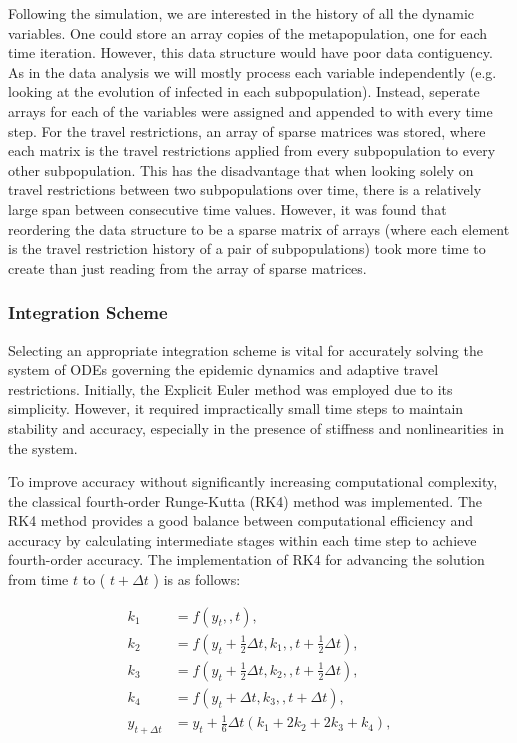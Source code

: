 
Following the simulation, we are interested in the history of all the dynamic variables. One could store an array copies of the metapopulation, one for each time iteration. However, this data structure would have poor data contiguency. As in the data analysis we will mostly process each variable independently (e.g. looking at the evolution of infected in each subpopulation). Instead, seperate arrays for each of the variables were assigned and appended to with every time step. For the travel restrictions, an array of sparse matrices was stored, where each matrix is the travel restrictions applied from every subpopulation to every other subpopulation. This has the disadvantage that when looking solely on travel restrictions between two subpopulations over time, there is a relatively large span between consecutive time values. However, it was found that reordering the data structure to be a sparse matrix of arrays (where each element is the travel restriction history of a pair of subpopulations) took more time to create than just reading from the array of sparse matrices.\\

\subsubsection{Integration Scheme}

Selecting an appropriate integration scheme is vital for accurately solving the system of ODEs governing the epidemic dynamics and adaptive travel restrictions. Initially, the Explicit Euler method was employed due to its simplicity. However, it required impractically small time steps to maintain stability and accuracy, especially in the presence of stiffness and nonlinearities in the system.

To improve accuracy without significantly increasing computational complexity, the classical fourth-order Runge-Kutta (RK4) method was implemented. The RK4 method provides a good balance between computational efficiency and accuracy by calculating intermediate stages within each time step to achieve fourth-order accuracy. The implementation of RK4 for advancing the solution from time $t$ to ( $t + \Delta t$ ) is as follows:

\begin{align*} 
	k_1 &= f\left(y_t,, t\right), \\ k_2 &= f\left(y_t + \tfrac{1}{2}\Delta t, k_1,, t + \tfrac{1}{2}\Delta t\right), \\ k_3 &= f\left(y_t + \tfrac{1}{2}\Delta t, k_2,, t + \tfrac{1}{2}\Delta t\right), \\ k_4 &= f\left(y_t + \Delta t, k_3,, t + \Delta t\right), \\ y_{t + \Delta t} &= y_t + \tfrac{1}{6}\Delta t\left(k_1 + 2k_2 + 2k_3 + k_4\right), \end{align*}

